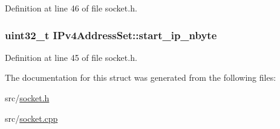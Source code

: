 Definition at line 46 of file socket.\+h.

\subsubsection[{\texorpdfstring{start\+\_\+ip\+\_\+nbyte}{start_ip_nbyte}}]{\setlength{\rightskip}{0pt plus 5cm}uint32\+\_\+t I\+Pv4\+Address\+Set\+::start\+\_\+ip\+\_\+nbyte}\hypertarget{structIPv4AddressSet_a713c0748adbcb67c8e00ae98bfefabcb}{}\label{structIPv4AddressSet_a713c0748adbcb67c8e00ae98bfefabcb}


Definition at line 45 of file socket.\+h.



The documentation for this struct was generated from the following files\+:\begin{DoxyCompactItemize}
\item 
src/\hyperlink{socket_8h}{socket.\+h}\item 
src/\hyperlink{socket_8cpp}{socket.\+cpp}\end{DoxyCompactItemize}
